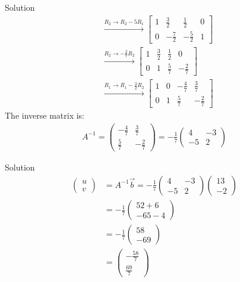 \documentclass{beamer}
\newcommand{\myvec}[1]{\ensuremath{\begin{pmatrix}#1\end{pmatrix}}}
\begin{document}
\begin{frame}{Solution}
	\begin{align}
&\xrightarrow{R_2 \rightarrow R_2 - 5R_1}
\left[\begin{array}{cc|cc}
	1 & \frac{3}{2} & \frac{1}{2} & 0 \\
	0 & -\frac{7}{2} & -\frac{5}{2} & 1
\end{array}\right] \\
&\xrightarrow{R_2 \rightarrow -\frac{2}{7}R_2}
\left[\begin{array}{cc|cc}
	1 & \frac{3}{2} & \frac{1}{2} & 0 \\
	0 & 1 & \frac{5}{7} & -\frac{2}{7}
\end{array}\right] \\
&\xrightarrow{R_1 \rightarrow R_1 - \frac{3}{2}R_2}
\left[\begin{array}{cc|cc}
	1 & 0 & -\frac{4}{7} & \frac{3}{7} \\
	0 & 1 & \frac{5}{7} & -\frac{2}{7}
\end{array}\right]
\end{align}
The inverse matrix is:
\begin{align}
A^{-1} = 
\begin{pmatrix}
	-\frac{4}{7} & \frac{3}{7} \\
	\frac{5}{7} & -\frac{2}{7}
\end{pmatrix}
= -\frac{1}{7}
\begin{pmatrix}
	4 & -3 \\
	-5 & 2
\end{pmatrix}
\end{align}

\end{frame}
\begin{frame}{Solution}
\begin{align}
	\myvec{u \\ v} 
	&= A^{-1}\vec{b} = -\frac{1}{7}\myvec{4 & -3 \\ -5 & 2}\myvec{13 \\ -2} \\
	&= -\frac{1}{7}\myvec{52+6 \\ -65-4} \\
	&= -\frac{1}{7}\myvec{58 \\ -69} \\
	&= \myvec{-\frac{58}{7} \\ \frac{69}{7}}
\end{align}
\end{frame}
\end{document}
